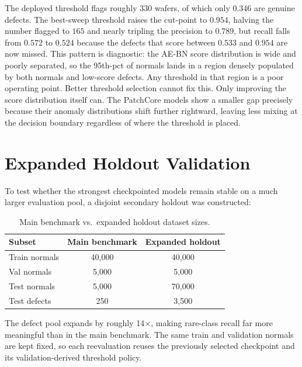 \documentclass[11pt]{article}
\begin{document}
The deployed threshold flags roughly $330$ wafers, of which only $0.346$ are genuine defects.
The best-sweep threshold raises the cut-point to $0.954$, halving the number flagged to $165$
and nearly tripling the precision to $0.789$, but recall falls from $0.572$ to $0.524$ because
the defects that score between $0.533$ and $0.954$ are now missed.
This pattern is diagnostic: the AE-BN score distribution is wide and poorly separated, so the
95th-pct of normals lands in a region densely populated by both normals and low-score defects.
Any threshold in that region is a poor operating point.
Better threshold selection cannot fix this. Only improving the score distribution itself can.
The PatchCore models show a smaller gap precisely because their anomaly distributions shift further
rightward, leaving less mixing at the decision boundary regardless of where the threshold is placed.

\section{Expanded Holdout Validation}
\label{sec:holdout}

To test whether the strongest checkpointed models remain stable on a much larger
evaluation pool, a disjoint secondary holdout was constructed:

\begin{table}[H]
\centering
\caption{Main benchmark vs.\ expanded holdout dataset sizes.}
\label{tab:holdout_sizes}
\begin{tabular}{lcc}
\toprule
Subset & Main benchmark & Expanded holdout \\
\midrule
Train normals & 40{,}000 & 40{,}000 \\
Val normals   &  5{,}000 &  5{,}000 \\
Test normals  &  5{,}000 & 70{,}000 \\
Test defects  &    250   &  3{,}500 \\
\bottomrule
\end{tabular}
\end{table}

The defect pool expands by roughly 14$\times$, making rare-class recall far more
meaningful than in the main benchmark. The same train and validation normals are
kept fixed, so each reevaluation reuses the previously selected checkpoint and
its validation-derived threshold policy.
\end{document}
